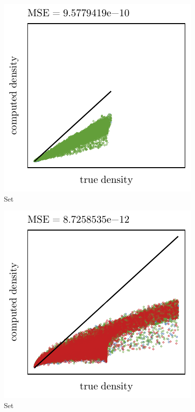 \begin{subfigure}{0.3\textwidth}
	\centering
	\includegraphics[keepaspectratio=true, width=\textwidth, height=0.23\textheight]{4/img/results_ferdosi_4_60000_mbe_breiman.pdf}
	\caption{Set \ferdosiFour}
	\label{fig:4:simulated:datasets:mbe:ferdosi4}
\end{subfigure}
\begin{subfigure}{0.3\textwidth}
	\centering
	\includegraphics[keepaspectratio=true, width=\textwidth, height=0.23\textheight]{4/img/results_ferdosi_5_60000_mbe_breiman.pdf}
	\caption{Set \ferdosiFive}
	\label{fig:4:simulated:datasets:mbe:ferdosi5}
\end{subfigure}	